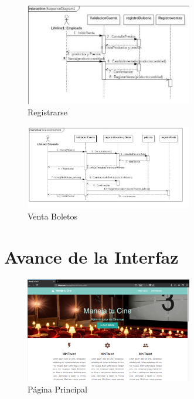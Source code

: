 \documentclass[12pt, fleqn]{report}                             %
\begin{document}
        \begin{figure}[ht]
            \centering
            \includegraphics[width=0.65\textwidth]{DiagramaSecuencial11}
            \caption{Registrarse}
        \end{figure}


        \begin{figure}[ht]
            \centering
            \includegraphics[width=0.65\textwidth]{DiagramaSecuencial12}
            \caption{Venta Boletos}
        \end{figure}


    \clearpage
    \section{Avance de la Interfaz}

        \begin{figure}[ht]
            \centering
            \includegraphics[width=0.65\textwidth]{EjemploInterfazSegundaParte1}
            \caption{Página Principal}
        \end{figure}
\end{document}
